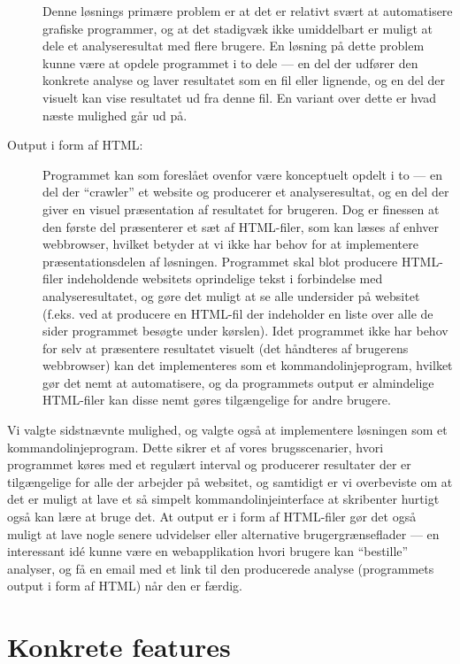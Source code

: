 \documentclass[a4paper,oneside,article]{memoir}
\begin{document}
\begin{description}
  Denne løsnings primære problem er at det er relativt svært at
  automatisere grafiske programmer, og at det stadigvæk ikke
  umiddelbart er muligt at dele et analyseresultat med flere
  brugere. En løsning på dette problem kunne være at opdele programmet
  i to dele --- en del der udfører den konkrete analyse og laver
  resultatet som en fil eller lignende, og en del der visuelt kan vise
  resultatet ud fra denne fil. En variant over dette er hvad næste
  mulighed går ud på.

\item[Output i form af HTML:]
  Programmet kan som foreslået ovenfor være konceptuelt opdelt i
  to --- en del der ``crawler'' et website og producerer et
  analyseresultat, og en del der giver en visuel præsentation af
  resultatet for brugeren. Dog er finessen at den første del
  præsenterer et sæt af HTML-filer, som kan læses af enhver
  webbrowser, hvilket betyder at vi ikke har behov for at implementere
  præsentationsdelen af løsningen. Programmet skal blot producere
  HTML-filer indeholdende websitets oprindelige tekst i forbindelse
  med analyseresultatet, og gøre det muligt at se alle undersider på
  websitet (f.eks. ved at producere en HTML-fil der indeholder en
  liste over alle de sider programmet besøgte under kørslen). Idet
  programmet ikke har behov for selv at præsentere resultatet visuelt
  (det håndteres af brugerens webbrowser) kan det implementeres som et
  kommandolinjeprogram, hvilket gør det nemt at automatisere, og da
  programmets output er almindelige HTML-filer kan disse nemt gøres
  tilgængelige for andre brugere.
\end{description}

Vi valgte sidstnævnte mulighed, og valgte også at implementere
løsningen som et kommandolinjeprogram. Dette sikrer et af vores
brugsscenarier, hvori programmet køres med et regulært interval og
producerer resultater der er tilgængelige for alle der arbejder på
websitet, og samtidigt er vi overbeviste om at det er muligt at lave
et så simpelt kommandolinjeinterface at skribenter hurtigt også kan
lære at bruge det. At output er i form af HTML-filer gør det også
muligt at lave nogle senere udvidelser eller alternative
brugergrænseflader --- en interessant idé kunne være en webapplikation
hvori brugere kan ``bestille'' analyser, og få en email med et link
til den producerede analyse (programmets output i form af HTML) når
den er færdig.

\section{Konkrete features}
\end{document}
